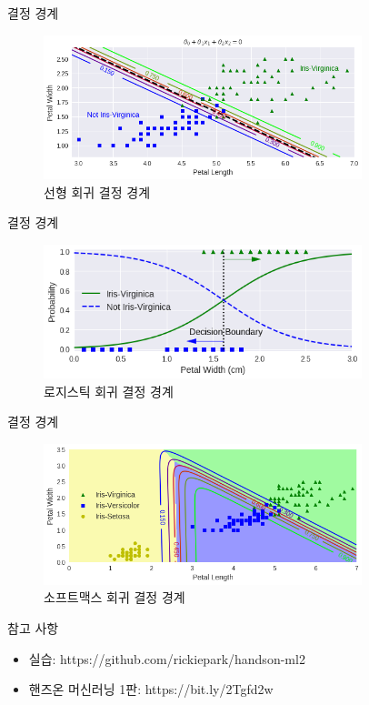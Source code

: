 \documentclass{beamer}
\numberwithin{equation}{section}
\begin{document}

\begin{frame}{결정 경계}

\begin{figure}
\includegraphics[width=25em]{./images/linear_decision_boundary}
\caption{\label{fig:linear_decision_boundary}선형 회귀 결정 경계}
\end{figure}

\end{frame}


\begin{frame}{결정 경계}

\begin{figure}
\includegraphics[width=25em]{./images/logistic_decision_boundary}
\caption{\label{fig:logistic_decision_boundary}로지스틱 회귀 결정 경계}
\end{figure}

\end{frame}


\begin{frame}{결정 경계}

\begin{figure}
\includegraphics[width=25em]{./images/softmax_decision_boundary}
\caption{\label{fig:softmax_decision_boundary}소프트맥스 회귀 결정 경계}
\end{figure}

\end{frame}


\begin{frame}{참고 사항}

\begin{itemize}
\item 실습: https://github.com/rickiepark/handson-ml2
\vskip 0.5cm
\item 핸즈온 머신러닝 1판: https://bit.ly/2Tgfd2w
\end{itemize}

\end{frame}

\end{document}
